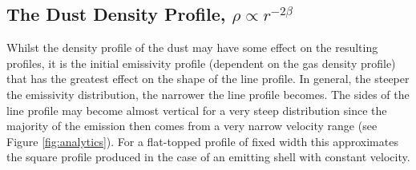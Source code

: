 \subsection{The Dust Density Profile, $\rho \propto r^{-2\beta}$}
\label{beta}

Whilst the density profile of the dust may have some effect on the 
resulting profiles, it is the initial emissivity profile (dependent on the 
gas density profile) that has the greatest effect on the shape of the line 
profile.  In general, the steeper the emissivity distribution, the 
narrower the line profile becomes.  The sides of the line profile may 
become almost vertical for a very steep distribution since the majority of 
the emission then comes from a very narrow velocity range (see Figure 
\ref{fig:analytics}).  For a flat-topped profile of 
fixed width this approximates the square profile produced in the case of 
an emitting shell with constant velocity.

